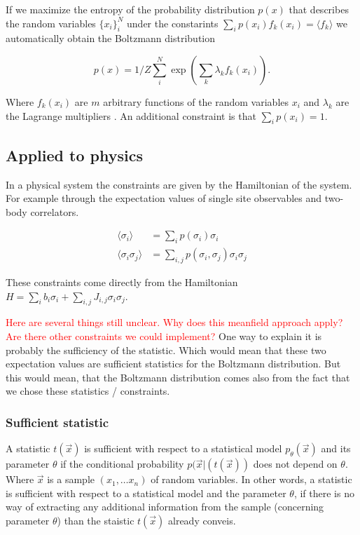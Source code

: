 \documentclass[nofootinbib, superscriptaddress, prl]{revtex4}
\begin{document}
If we maximize the entropy of the probability distribution $p(x)$ that describes the random variables $\{x_i\}_i^N$ under the constarints $\sum_i p(x_i) f_k(x_i) = \langle f_k \rangle$ we automatically obtain the Boltzmann distribution 

\begin{equation*}
p(x) = 1/Z \sum_i^N \exp(\sum_k \lambda_k f_k(x_i)).
\end{equation*} 

Where $f_k(x_i)$ are $m$ arbitrary functions of the random variables $x_i$ and $\lambda_k$ are the Lagrange multipliers . An additional constraint is that $\sum_i p(x_i) = 1$.

\subsection{Applied to physics}

In a physical system the constraints are given by the Hamiltonian of the system. For example through the expectation values of single site observables and two-body correlators.

\begin{align*}
	\langle \sigma_i \rangle &= \sum_i p(\sigma_i) \sigma_i \\
	\langle \sigma_i \sigma_j \rangle &= \sum_{i,j} p(\sigma_i, \sigma_j) \sigma_i \sigma_j 
\end{align*}

These constraints come directly from the Hamiltonian $H = \sum_i b_i \sigma_i  + \sum_{i,j} J_{i,j} \sigma_i \sigma_j$.


\textcolor{red}{Here are several things still unclear. Why does this meanfield approach apply? Are there other constraints we could implement?} One way to explain it is probably the sufficiency of the statistic. Which would mean that these two expectation values are sufficient statistics for the Boltzmann distribution. But this would mean, that the Boltzmann distribution comes also from the fact that we chose these statistics / constraints.

\subsubsection{Sufficient statistic}
A statistic $t(\vec{x})$ is sufficient with respect to a statistical model $p_{\theta}(\vec{x})$ and its parameter $\theta$ if  the conditional probability $p(\vec{x}|(t(\vec{x}))$ does not depend on $\theta$. Where $\vec{x}$ is a sample $(x_1, \dots x_n)$ of random variables. In other words, a statistic is sufficient with respect to a statistical model and the parameter $\theta$, if there is no way of extracting any additional information from the sample (concerning parameter $\theta$) than the staistic $t(\vec{x})$ already conveis.
\end{document}
